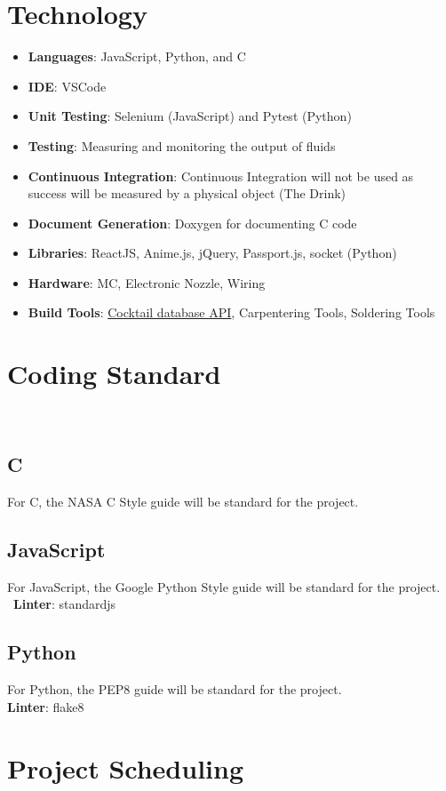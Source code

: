 \documentclass{article}
\begin{document}
\section{Technology}

\begin{itemize}
\item \textbf{Languages}: JavaScript, Python, and C
\item\textbf{IDE}: VSCode
\item \textbf{Unit Testing}: Selenium (JavaScript) and Pytest (Python)
\item \textbf{Testing}: Measuring and monitoring the output of fluids
\item \textbf{Continuous Integration}: Continuous Integration will not be used as success will be measured by a physical object (The Drink)
\item \textbf{Document Generation}: Doxygen for documenting C code
\item \textbf{Libraries}: ReactJS, Anime.js, jQuery, Passport.js, socket (Python)
\item \textbf{Hardware}: MC, Electronic Nozzle, Wiring
\item \textbf{Build Tools}:  \href{https://www.thecocktaildb.com/api.php}{Cocktail database API}, Carpentering Tools, Soldering Tools
\end{itemize}

\section{Coding Standard}
\\
\subsection{C}
For C, the NASA C Style guide will be standard for the project.
\subsection{JavaScript}
For JavaScript, the Google Python Style guide will be standard for the project.
\ \textbf{Linter}: standardjs
\subsection{Python}
For Python, the PEP8 guide will be standard for the project.
\\ \textbf{Linter}: flake8
\section{Project Scheduling}
\end{document}
